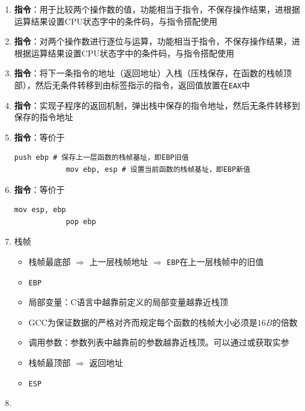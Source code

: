 \documentclass[a4paper,12pt]{article}
\begin{document}
\begin{enumerate}
        \item \textbf{指令}：用于比较两个操作数的值，功能相当于指令，不保存操作结果，进根据运算结果设置CPU状态字中的条件码，与指令搭配使用
        \item \textbf{指令}：对两个操作数进行逐位与运算，功能相当于指令，不保存操作结果，进根据运算结果设置CPU状态字中的条件码，与指令搭配使用
        \item \textbf{指令}：将下一条指令的地址（返回地址）入栈（压栈保存，在函数的栈帧顶部），然后无条件转移到由标签指示的指令，返回值放置在\texttt{EAX}中
        \item \textbf{指令}：实现子程序的返回机制，弹出栈中保存的指令地址，然后无条件转移到保存的指令地址
        \item \textbf{指令}：等价于
        \begin{lstlisting}[language={[x86masm]Assembler}]
            push ebp # 保存上一层函数的栈帧基址，即EBP旧值
            mov ebp, esp # 设置当前函数的栈帧基址，即EBP新值
        \end{lstlisting}
        \item \textbf{指令}：等价于
        \begin{lstlisting}[language={[x86masm]Assembler}]
            mov esp, ebp
            pop ebp
        \end{lstlisting}
        \item 栈帧
        \begin{itemize}
            \item 栈帧最底部 $\Rightarrow$ 上一层栈帧地址 $\Rightarrow$ \texttt{EBP}在上一层栈帧中的旧值
            \item \texttt{EBP}
            \item 局部变量：C语言中越靠前定义的局部变量越靠近栈顶
            \item GCC为保证数据的严格对齐而规定每个函数的栈帧大小必须是$16B$的倍数
            \item 调用参数：参数列表中越靠前的参数越靠近栈顶。可以通过或获取实参
            \item 栈帧最顶部 $\Rightarrow$ 返回地址
            \item \texttt{ESP}
        \end{itemize}
        \item
        \begin{analysisbox}
            \begin{lstlisting}[language={[x86masm]Assembler}]

\end{lstlisting}
\end{analysisbox}
\end{enumerate}
\end{document}
